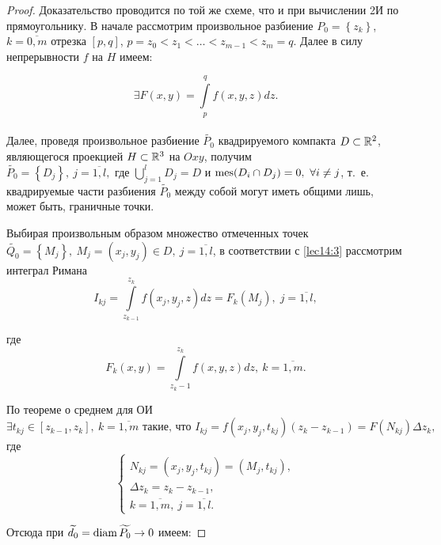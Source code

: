 \documentclass[../../main.tex]{subfiles}
\begin{document}
		
	\begin{proof}
		Доказательство проводится по той же схеме, что и при вычислении 2И по 
		прямоугольнику. В начале рассмотрим произвольное разбиение $P_0 = \left\{ 
		z_k \right\}$, $k = 
		\overline{0, m}$ отрезка $\left[p, q\right]$, $p = z_0 < z_1 < \ldots < z_{m 
		- 1} < z_m = q.$ Далее в силу непрерывности $f$ на $H$ имеем:
		
		\begin{equation}
		\exists F\left(x, y\right) = \int\limits_{p}^{q} f\left(x, y, z\right) dz.
		\label{lec14:3}
		\end{equation}\\
		Далее, проведя произвольное разбиение $\widetilde{P_0}$ квадрируемого 
		компакта $D \subset 
		\mathbb{R}^2$, являющегося проекцией $H \subset \mathbb{R}^3$ на $Oxy$, получим
		$\widetilde{P_0} = \left\{D_j \right\},\ j = \overline{1, l}, \text{ где } 
		\bigcup\limits_{j = 1}^l D_j = D$ и $\operatorname{mes}(D_i \cap D_j) = 0,\ \forall i \neq 
		j$, т.~е. квадрируемые части разбиения $\widetilde{P_0}$ между собой могут 
		иметь общими 
		лишь, может быть, граничные точки.
		
		Выбирая произвольным образом множество отмеченных точек $\widetilde{Q_0} = 
		\left\{ M_j \right\},\ M_j = \left(x_j, y_j\right) \in D,\ j = \overline{1, 
		l}$, в соответствии с \eqref{lec14:3} рассмотрим интеграл Римана
		\begin{equation} 
		I_{kj} = \int\limits_{z_{k-1}}^{z_k} f(x_j, y_j, z)dz = F_k (M_j),\; j = 
		\overline{1, l},  \label{lec14:4}
		\end{equation}
		
		где \[F_k(x, y) = \int\limits_{z_k - 1}^{z_k} f\left(x, y, z\right)dz,\ k = 
		\overline{1, m}.\]
		 
		По теореме о среднем для ОИ
		\begin{equation}
			\exists t_{kj} \in \left[z_{k - 1}, z_k 
		\right],\ k = \overline{1, m} \text{ такие, что }
		 	I_{kj} = f(x_j, y_j, t_{kj})\left(z_k - z_{k - 1}\right) = 
		 	F(N_{kj}) \Delta z_k, \label{lec14:5}
		 \end{equation}
		где \[\begin{cases}
		N_{kj} = (x_j, y_j, t_{kj}) = (M_j, t_{kj}),\\
		\Delta z_k = z_k - z_{k - 1}, \\ k = \overline{1, m},\ j = \overline{1, l}.
		\end{cases}\]
		
		Отсюда при $\widetilde{d_0} = \operatorname{diam} \widetilde{P_0} \to 0$ имеем: 
		

\end{proof}
\end{document}
